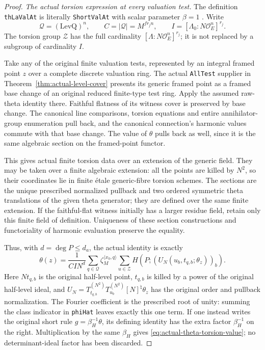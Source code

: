 \begin{proof}
\emph{The actual torsion expression at every valuation test.}
The definition \texttt{thLaValAt} is literally
\texttt{ShortValAt} with scalar parameter $\beta=1$
\cite{actual-denominator-source}.  Write
\[
 \mathcal Q=(\mathrm{LevQ})^n,\qquad C=|\mathcal Q|=M^{f r_j n},
 \qquad I=[\Lambda_0:N\mathcal O_E^n]^{r_j}.
\]
The torsion group $\mathcal Z$ has the full cardinality
$[\Lambda:N\mathcal O_E^n]^{r_j}$; it is not replaced by a
subgroup of cardinality $I$.

Take any of the original finite valuation tests, represented by an
integral framed point $z$ over a complete discrete valuation ring.
The actual \texttt{AllTest} supplier in
Theorem~\ref{thm:actual-level-cover} presents its generic framed
point as a framed base change of an original reduced finite-type
test ring.  Apply the assumed raw-theta identity there.  Faithful
flatness of its witness cover is preserved by base change.  The
canonical line comparisons, torsion equations and entire
annihilator-group enumeration pull back, and the canonical
connection's harmonic values commute with that base change.
The value of $\theta$ pulls back as well, since it is the same
algebraic section on the framed-point functor.

This gives actual finite torsion data over an extension of the
generic field.  They may be taken over a finite algebraic extension:
all the points are killed by $N^2$, so their coordinates lie in
finite \'etale generic-fibre torsion schemes.  The sections are
the unique prescribed normalized pullback and two ordered symmetric
theta translations of the given theta generator; they are defined
over the same finite extension.  If the faithful-flat witness
initially has a larger residue field, retain only this finite field
of definition.  Uniqueness of these section constructions and
functoriality of harmonic evaluation preserve the equality.

Thus, with $d=\deg P\le d_a$, the actual identity is exactly
\begin{equation}\label{eq:actual-theta-torsion-value}
 \theta(z)=\frac1{CIN^d}
    \sum_{q\in\mathcal Q}\zeta_M^{\langle x_0,q\rangle}
    \sum_{u\in\mathcal Z}
         H\!\left(P;(U_N(u_b,t_{q,b};\theta_z))_b\right).
\end{equation}
Here $Nt_{q,b}$ is the original half-level point, $t_{q,b}$ is
killed by a power of the original half-level ideal, and
$U_N=T_{t_{q,b}}^{(N^2)}T_{u_b}^{(N^2)}[N]^\natural\theta_z$
has the original order and pullback normalization.  The Fourier
coefficient is the prescribed root of unity: summing the class
indicator in \texttt{phiHat} leaves exactly this one term.
If one instead writes the original short rule
$g=\beta_H^{-1}\theta$, its defining identity has the extra factor
$\beta_H^{-1}$ on the right.  Multiplication by the same
$\beta_H$ gives \eqref{eq:actual-theta-torsion-value}; no
determinant-ideal factor has been discarded.


\end{proof}
